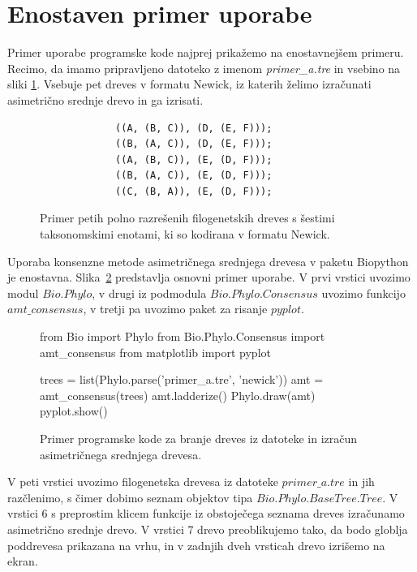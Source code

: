 \documentclass[a4paper, 12pt]{book}
\begin{document}
\section{Enostaven primer uporabe}
Primer uporabe programske kode najprej prikažemo na
enostavnejšem primeru. Recimo, da imamo pripravljeno datoteko z imenom 
{\it primer\_a.tre} in vsebino na sliki \ref{trees-input}. Vsebuje pet dreves
v formatu Newick, iz katerih želimo izračunati asimetrično srednje drevo
in ga izrisati.

\begin{figure}[h!]
\begin{lstlisting}
             ((A, (B, C)), (D, (E, F)));
             ((B, (A, C)), (D, (E, F)));
             ((A, (B, C)), (E, (D, F)));
             ((B, (A, C)), (E, (D, F)));
             ((C, (B, A)), (E, (D, F)));
\end{lstlisting}
\caption{
	Primer petih polno razrešenih filogenetskih dreves s šestimi taksonomskimi 
	enotami, ki so kodirana v formatu Newick.
}
\label{trees-input}
\end{figure}

Uporaba konsenzne metode asimetričnega srednjega drevesa v paketu Biopython je 
enostavna. Slika~\ref{amt-example} predstavlja osnovni primer uporabe. V prvi 
vrstici uvozimo modul $Bio.Phylo$, v drugi iz podmodula $Bio.Phylo.Consensus$ 
uvozimo funkcijo $amt\_consensus$,  v tretji pa uvozimo paket za risanje $pyplot$.

\begin{figure}[h!]
	\begin{python}
		from Bio import Phylo
		from Bio.Phylo.Consensus import amt_consensus
		from matplotlib import pyplot
	
		trees = list(Phylo.parse('primer_a.tre', 'newick'))
		amt = amt_consensus(trees)
		amt.ladderize()
		Phylo.draw(amt)
		pyplot.show()
	\end{python}
	\caption{
		Primer programske kode za branje dreves iz datoteke in izračun 
		asimetričnega srednjega drevesa.
	}
	\label{amt-example}
\end{figure}


V peti vrstici uvozimo filogenetska drevesa iz datoteke $primer\_a.tre$ in jih 
razčlenimo, s čimer dobimo seznam objektov tipa $Bio.Phylo.BaseTree.Tree$. V 
vrstici 6 s preprostim klicem funkcije iz obstoječega seznama dreves 
izračunamo asimetrično srednje drevo. V vrstici 7 drevo preoblikujemo tako, 
da bodo globlja poddrevesa prikazana na vrhu, in v zadnjih dveh vrsticah drevo 
izrišemo na ekran. 
\end{document}

